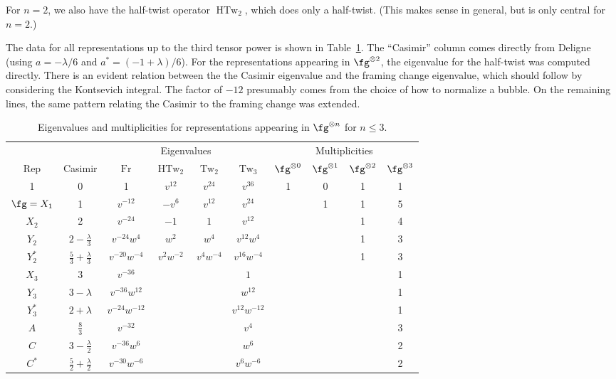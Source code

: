 \documentclass[12pt]{amsart}
\DeclareMathOperator{\Tw}{Tw}
\DeclareMathOperator{\HTw}{HTw}
\DeclareMathOperator{\Fr}{Fr}
\begin{document}
For $n=2$, we also have the half-twist operator $\HTw_2$, which does
only a half-twist. (This makes sense in general, but is only central
for $n=2$.)

The data for all representations up to the third tensor power is shown
in Table~\ref{tab:e-vals}. The ``Casimir'' column comes directly from
Deligne (using $a = -\lambda/6$ and $a^* = (-1+\lambda)/6$). For the
representations appearing in $\fg^{\otimes 2}$, the eigenvalue for the
half-twist was computed directly. There is an evident relation between
the the Casimir eigenvalue and the framing change eigenvalue, which
should follow by considering the Kontsevich integral. The factor of
$-12$ presumably comes from the choice of how to normalize a
bubble. On the remaining lines, the same pattern relating the Casimir
to the framing change was extended.

\begin{table}
  \centering
\medskip
\begin{tabular}{cccccccccc}
  \toprule
      &         &   \multicolumn{4}{c}{Eigenvalues}    & \multicolumn{4}{c}{Multiplicities} \\
  \cmidrule(lr){3-6} \cmidrule(l){7-10}
  Rep & Casimir & $\Fr$ & $\HTw_2$ & $\Tw_2$ & $\Tw_3$ & $\fg^{\otimes0}$ & $\fg^{\otimes1}$ & $\fg^{\otimes2}$ & $\fg^{\otimes3}$\\ \midrule
  1   & 0       & 1     & $v^{12}$ & $v^{24}$ & $v^{36}$
      & 1 & 0 & 1 & 1\\[3pt]
  $\fg=X_1$ & 1 & $v^{-12}$ & $-v^6$ & $v^{12}$ & $v^{24}$
      &   & 1 & 1 & 5\\[3pt]
  $X_2$ & 2     & $v^{-24}$ & $-1$ & $1$      & $v^{12}$
      &   &   & 1 & 4\\[3pt]
  $Y_2$ & $2 - \frac{\lambda}{3}$ & $v^{-24}w^4$ & $w^2$ & $w^4$ & $v^{12}w^4$
      &   &   & 1 & 3\\[3pt]
  $Y_2^*$ & $\frac{5}{3} + \frac{\lambda}{3}$ & $v^{-20}w^{-4}$ & $v^2 w^{-2}$ & $v^4 w^{-4}$ & $v^{16}w^{-4}$
      &   &   & 1 & 3\\[3pt]
  $X_3$ & $3$ & $v^{-36}$ & & & $1$ &&&& 1\\[3pt]
  $Y_3$ & $3 - \lambda$ & $v^{-36}w^{12}$ &&& $w^{12}$ &&&& 1\\[3pt]
  $Y_3^*$ & $2 + \lambda$ & $v^{-24}w^{-12}$ &&& $v^{12}w^{-12}$ &&&& 1\\[3pt]
  $A$ & $\frac{8}{3}$ & $v^{-32}$ &&& $v^4$ &&&& 3\\[3pt]
  $C$ & $3 - \frac{\lambda}{2}$ & $v^{-36}w^6$ &&& $w^6$ &&&& 2\\[3pt]
  $C^*$ & $\frac{5}{2} + \frac{\lambda}{2}$ & $v^{-30}w^{-6}$ &&& $v^6w^{-6}$ &&&& 2\\[3pt]
  \bottomrule
\end{tabular}
\medskip
\caption{Eigenvalues and multiplicities for representations appearing in $\fg^{\otimes n}$ for $n \le 3$.}
\label{tab:e-vals}
\end{table}



\end{document}
